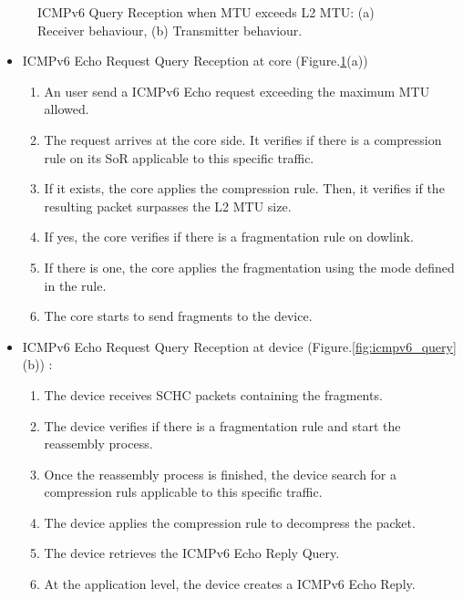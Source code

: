 \begin{figure}[!tbp]
  \begin{minipage}[b]{0.33\columnwidth}
  \centering
    
  \end{minipage}
  \hfill
  \begin{minipage}[b]{0.33\columnwidth}
  \centering
    
  \end{minipage}
\caption{ICMPv6 Query Reception when MTU exceeds L2 MTU: (a) Receiver behaviour, (b) Transmitter behaviour.}    \label{fig-icmpv6_query}
\end{figure}

\begin{itemize}
    \item ICMPv6 Echo Request Query Reception at core (Figure.\ref{fig-icmpv6_query}(a))
\begin{enumerate}
    \item An user send a ICMPv6 Echo request exceeding the maximum MTU allowed.
    \item The request arrives at the core side. It verifies if there is a compression rule on its SoR applicable to this specific traffic.
    \item If it exists, the core applies the compression rule. 
    Then, it verifies if the resulting packet surpasses the L2 MTU size.
    \item If yes, the core verifies if there is a fragmentation rule on dowlink.
    \item If there is one, the core applies the fragmentation using the mode defined in the rule.
    \item The core starts to send fragments to the device.
    \end{enumerate}

\item ICMPv6 Echo Request Query Reception at device (Figure.\ref{fig:icmpv6_query}(b)) : 
\begin{enumerate}
    \item The device receives SCHC packets containing the fragments.
    \item The device verifies if there is a fragmentation rule and start the reassembly process.
    \item Once the reassembly process is finished, the device search for a compression ruls applicable to this specific traffic.
    \item The device applies the compression rule to decompress the packet.
    \item The device retrieves the ICMPv6 Echo Reply Query.
    \item At the application level, the device creates a ICMPv6 Echo Reply.
\end{enumerate}


\end{itemize}
